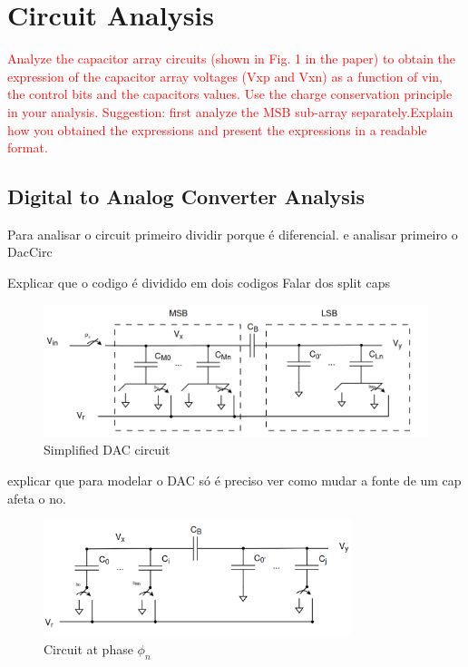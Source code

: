 \section{Circuit Analysis}

\textcolor{red}{Analyze the capacitor array circuits (shown in Fig. 1 in the paper) to obtain the
expression of the capacitor array voltages (Vxp and Vxn) as a function of vin, the control bits and the capacitors values. Use the charge conservation principle in
your analysis. Suggestion: first analyze the MSB sub-array separately.Explain how you obtained the expressions and present the expressions in a readable format.}

\subsection{Digital to Analog Converter Analysis}

Para analisar o circuit primeiro dividir porque é diferencial. e analisar primeiro o DacCirc

Explicar que o codigo é dividido em dois codigos
Falar dos split caps

\begin{figure}[H]
    \centering
    \includegraphics*[scale = 0.35]{Images/DacCirc.png}
    \caption{Simplified DAC circuit}
    \label{fig:DAC_Circ}
\end{figure}

explicar que para modelar o DAC só é preciso ver como mudar a fonte de um cap afeta o no.

\begin{figure}[H]

    \centering
    \includegraphics*[width=0.8\textwidth]{Images/DACCircPn.png}
    \caption{Circuit at phase $\phi_n$}

    \label{fig:P1_Circ}
\end{figure}

